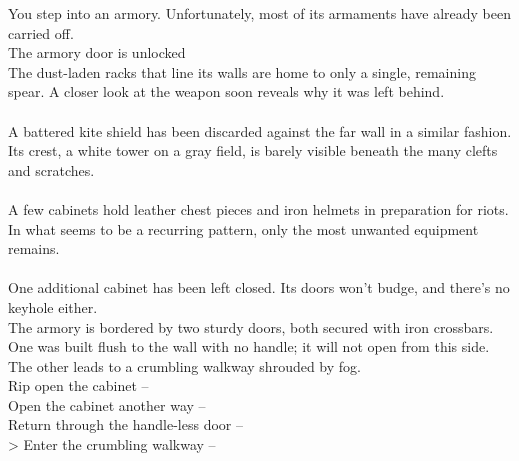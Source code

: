 You step into an armory. Unfortunately, most of its armaments have already been carried off.\\
 The armory door is unlocked\\

The dust-laden racks that line its walls are home to only a single, remaining spear. A closer look at the weapon soon reveals why it was left behind.\\
\\

A battered kite shield has been discarded against the far wall in a similar fashion. Its crest, a white tower on a gray field, is barely visible beneath the many clefts and scratches.\\
\\

A few cabinets hold leather chest pieces and iron helmets in preparation for riots. In what seems to be a recurring pattern, only the most unwanted equipment remains.\\
\\

One additional cabinet has been left closed. Its doors won’t budge, and there’s no keyhole either.\\

The armory is bordered by two sturdy doors, both secured with iron crossbars. One was built flush to the wall with no handle; it will not open from this side. The other leads to a crumbling walkway shrouded by fog.\\

 Rip open the cabinet -- \\
 Open the cabinet another way -- \\
 Return through the handle-less door -- \\
> Enter the crumbling walkway -- 